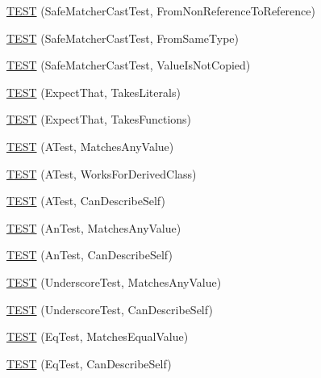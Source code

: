 \begin{DoxyCompactItemize}
\item 
\mbox{\hyperlink{namespacetesting_1_1gmock__matchers__test_a362ce5b2b395dfd6363e4d80b49951f1}{T\+E\+ST}} (Safe\+Matcher\+Cast\+Test, From\+Non\+Reference\+To\+Reference)
\item 
\mbox{\hyperlink{namespacetesting_1_1gmock__matchers__test_a9fc149b429176a45e45267132ae901bd}{T\+E\+ST}} (Safe\+Matcher\+Cast\+Test, From\+Same\+Type)
\item 
\mbox{\hyperlink{namespacetesting_1_1gmock__matchers__test_ac82f8355af7a1e6ba3b67ba8423a1d73}{T\+E\+ST}} (Safe\+Matcher\+Cast\+Test, Value\+Is\+Not\+Copied)
\item 
\mbox{\hyperlink{namespacetesting_1_1gmock__matchers__test_a7672c72f955b937542acd87d18dd7ea6}{T\+E\+ST}} (Expect\+That, Takes\+Literals)
\item 
\mbox{\hyperlink{namespacetesting_1_1gmock__matchers__test_aafaf5273bd3d8ba273a5dd243d3a52ba}{T\+E\+ST}} (Expect\+That, Takes\+Functions)
\item 
\mbox{\hyperlink{namespacetesting_1_1gmock__matchers__test_af15da53cdc65283b8ca688a03801fd12}{T\+E\+ST}} (A\+Test, Matches\+Any\+Value)
\item 
\mbox{\hyperlink{namespacetesting_1_1gmock__matchers__test_a2b2dfb85d18883b07f7d13d21abee2fc}{T\+E\+ST}} (A\+Test, Works\+For\+Derived\+Class)
\item 
\mbox{\hyperlink{namespacetesting_1_1gmock__matchers__test_a24432bc861bee430fb8ac1a4e5463ecf}{T\+E\+ST}} (A\+Test, Can\+Describe\+Self)
\item 
\mbox{\hyperlink{namespacetesting_1_1gmock__matchers__test_a15bf6771986d1e9f675f29861f7551c1}{T\+E\+ST}} (An\+Test, Matches\+Any\+Value)
\item 
\mbox{\hyperlink{namespacetesting_1_1gmock__matchers__test_ac3b18688ca5b5cf2d6137ce3e7397691}{T\+E\+ST}} (An\+Test, Can\+Describe\+Self)
\item 
\mbox{\hyperlink{namespacetesting_1_1gmock__matchers__test_a3fc77fa5ca709ef70963026fd7114552}{T\+E\+ST}} (Underscore\+Test, Matches\+Any\+Value)
\item 
\mbox{\hyperlink{namespacetesting_1_1gmock__matchers__test_a25ae831c15c9ca918ed847ba147ac572}{T\+E\+ST}} (Underscore\+Test, Can\+Describe\+Self)
\item 
\mbox{\hyperlink{namespacetesting_1_1gmock__matchers__test_a2ac5d4c2fae3e7f2e6c6be657a61f86a}{T\+E\+ST}} (Eq\+Test, Matches\+Equal\+Value)
\item 
\mbox{\hyperlink{namespacetesting_1_1gmock__matchers__test_a1c86e845cb44f34eeac4863041c871c6}{T\+E\+ST}} (Eq\+Test, Can\+Describe\+Self)

\end{DoxyCompactItemize}

